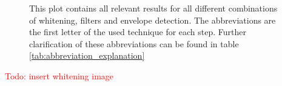 \begin{figure}[h!t]
	\begin{center}
	\noindent{}
	\end{center}
	\caption{This plot contains all relevant results for all different combinations of whitening, filters and envelope detection. The abbreviations are the first letter of the used technique for each step. Further clarification of these abbreviations can be found in table \ref{tab:abbreviation_explanation}}
	\label{fig:result_all_lagerrorscaling}
\end{figure}


\textcolor{red}{Todo: insert whitening image}

